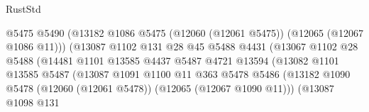 \begin{lexlean}{RustStd}
\begin{coremodule}
                                              @5475
                                              @5490
                                              (@13182
                                                @1086
                                                @5475
                                                (@12060 (@12061 @5475))
                                                (@12065 (@12067 @1086 @11)))
                                              (@13087
                                                @1102
                                                @131
                                                @28
                                                @45
                                                @5488
                                                @4431
                                                (@13067
                                                  @1102
                                                  @28
                                                  @5488
                                                  (@14481
                                                    @1101
                                                    @13585
                                                    @4437
                                                    @5487
                                                    @4721
                                                    @13594
                                                    (@13082
                                                      @1101
                                                      @13585
                                                      @5487
                                                      (@13087
                                                        @1091
                                                        @1100
                                                        @11
                                                        @363
                                                        @5478
                                                        @5486
                                                        (@13182
                                                          @1090
                                                          @5478
                                                          (@12060 (@12061 @5478))
                                                          (@12065 (@12067 @1090 @11)))
                                                        (@13087
                                                          @1098
                                                          @131

\end{coremodule}
\end{lexlean}

